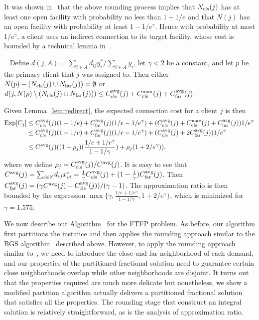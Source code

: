 \documentclass[11pt]{article}
\begin{document}
It was shown in~\cite{ByrkaA10} that the above rounding
process implies that $N_{\text{cls}}(j)$ has at least one open
facility with probability no less than $1-1/e$ and that
$N(j)$ has an open facility with probability at least
$1-1/e^\gamma$. Hence with probability at most $1/e^\gamma$,
a client uses an indirect connection to its target facility,
whose cost is bounded by a technical lemma
in~\cite{ByrkaA10}.


\begin{lemma}~\cite{ByrkaA10}
  \label{lem:redirect}
  Define $d(j,A)=\sum_{i\in A} d_{ij}y_i^\ast/\sum_{i\in A}
  y_i$, let $\gamma <2$ be a constant, and let $p$ be the
  primary client that $j$ was assigned to. Then either
  $N(p)-(N_{\text{cls}}(j)\cup N_{\text{far}}(j))=\emptyset$ or
  $d(j,N(p) \setminus (N_{\text{cls}}(j)\cup N_{\text{far}}(j))) \leq C_{\text{cls}}^{{\mbox{\scriptsize\rm avg}}}(j) +
  C_{\text{cls}}^{\max}(j) + C_{\text{far}}^{{\mbox{\scriptsize\rm avg}}}(j)$.
\end{lemma}

Given Lemma~\ref{lem:redirect}, the expected connection cost
for a client $j$ is then
\begin{align*}
  \mbox{\rm Exp}[C_j] &\leq C_{\text{cls}}^{{\mbox{\scriptsize\rm avg}}}(j)(1-1/e) + C_{\text{far}}^{{\mbox{\scriptsize\rm avg}}}(j)(1/e-1/e^\gamma) + (C_{\text{cls}}^{{\mbox{\scriptsize\rm avg}}}(j)
  + C_{\text{cls}}^{\max}(j)+C_{\text{far}}^{{\mbox{\scriptsize\rm avg}}}(j))1/e^\gamma \\
  &\leq C_{\text{cls}}^{{\mbox{\scriptsize\rm avg}}}(j)(1-1/e) +
  C_{\text{far}}^{{\mbox{\scriptsize\rm avg}}}(j)(1/e-1/e^\gamma) + (C_{\text{cls}}^{{\mbox{\scriptsize\rm avg}}}(j) + 2C_{\text{far}}^{{\mbox{\scriptsize\rm avg}}}(j))1/e^\gamma\\
  &\leq
  C^{{\mbox{\scriptsize\rm avg}}}(j)((1-\rho_j)(\frac{1/e+1/e^\gamma}{1-1/\gamma}) +
  \rho_j(1+2/e^\gamma)),
\end{align*}
where we define $\rho_j = C_{\text{cls}}^{{\mbox{\scriptsize\rm avg}}}(j)/C^{{\mbox{\scriptsize\rm avg}}}(j)$. It is
easy to see that $C^{{\mbox{\scriptsize\rm avg}}}(j) = \sum_{i\in\mathbb{F}}
d_{ij}x_{ij}^\ast = \frac{1}{\gamma}C_{\text{cls}}^{{\mbox{\scriptsize\rm avg}}}(j) +
(1-\frac{1}{\gamma})C_{\text{far}}^{{\mbox{\scriptsize\rm avg}}}(j)$. Then $C_{\text{far}}^{{\mbox{\scriptsize\rm avg}}}(j)=(\gamma
C^{{\mbox{\scriptsize\rm avg}}}(j)-C_{\text{cls}}^{{\mbox{\scriptsize\rm avg}}}(j))/(\gamma-1)$. The approximation
ratio is then bounded by the expression
$\max\{\gamma,\frac{1/e+1/e^\gamma}{1-1/\gamma},1+2/e^\gamma\}$,
which is minimized for $\gamma=1.575$.


\smallskip

We now describe our Algorithm~{\EBGS} for the FTFP
problem. As before, our algorithm first partitions the
instance and then applies the rounding approach similar to
the BGS algorithm~\cite{ByrkaGS10} described above. However,
to apply the rounding approach similar to~\cite{ByrkaGS10},
we need to introduce the close and far neighborhood of each
demand, and our properties of the partitioned fractional
solution need to guarantee certain close neighborhoods
overlap while other neighborhoods are disjoint. It turns out
that the properties required are much more delicate but
nonetheless, we show a modified partition algorithm actually
delivers a partitioned fractional solution that satisfies
all the properties. The rounding stage that construct an
integral solution is relatively straightforward, as is the
analysis of approximation ratio.
\end{document}
